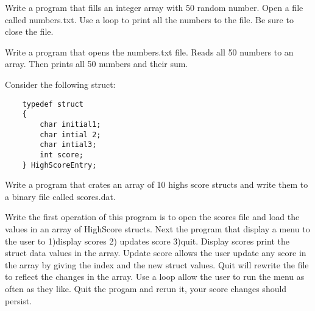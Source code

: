 

\begin{exercise}

Write a program that fills an integer array with 50 random number. Open a file called numbers.txt. Use a loop to print all the numbers to the file. Be sure to close the file.
\end{exercise}



\begin{exercise}
Write a program that opens the numbers.txt file. Reads all 50 numbers to an array. Then prints all 50 numbers and their sum.
\end{exercise}


\begin{exercise}
Consider the following struct:
\begin{verbatim}
	typedef struct
	{
		char initial1;
		char intial 2;
		char intial3;
		int score;
	} HighScoreEntry;
\end{verbatim}
Write a program that crates an array of 10 highs score structs and write them to a binary file called scores.dat.

Write the first operation of this program is to open the scores file and load the values in an array of HighScore structs. Next the program that display a menu to the user to 1)display scores 2) updates score 3)quit. Display scores print the struct data values in the array. Update score allows the user update any score in the array by giving the index and the new struct values. Quit will  rewrite the file to reflect the changes in the array. Use a loop  allow the user to run the menu as often as they like. Quit the progam and rerun it, your score changes should persist.

\end{exercise}


